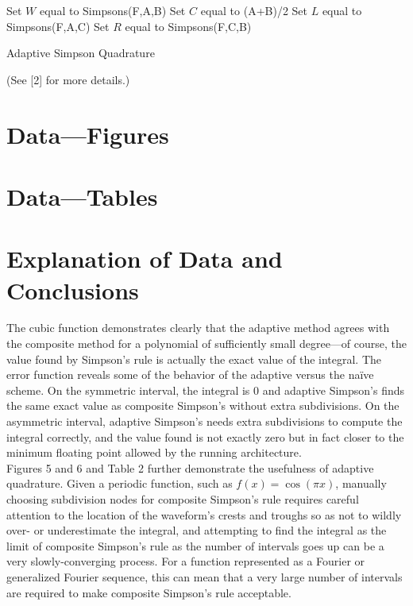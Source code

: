 \documentclass[11pt]{article} %
\begin{document}
\begin{algorithm}[H]
 Set $W$ equal to Simpsons(F,A,B)\;
Set $C$ equal to (A+B)/2\;
Set $L$ equal to Simpsons(F,A,C)\;
Set $R$ equal to Simpsons(F,C,B)\;

 \caption{Adaptive Simpson Quadrature}
\end{algorithm}

(See [2] for more details.)
\section{Data---Figures}


\section{Data---Tables}


\section{Explanation of Data and Conclusions}
The cubic function demonstrates clearly that the adaptive method agrees with the composite method for a polynomial of sufficiently small degree—of course, the value found by Simpson’s rule is actually the exact value of the integral. The error function reveals some of the behavior of the adaptive versus the naïve scheme. On the symmetric interval, the integral is 0 and adaptive Simpson’s finds the same exact value as composite Simpson’s without extra subdivisions. On the asymmetric interval, adaptive Simpson’s needs extra subdivisions to compute the integral correctly, and the value found is not exactly zero but in fact closer to the minimum floating point allowed by the running architecture.\\
Figures 5 and 6 and Table 2 further demonstrate the usefulness of adaptive quadrature. Given a periodic function, such as $f(x) = \cos(\pi x)$, manually choosing subdivision nodes for composite Simpson's rule requires careful attention to the location of the waveform's crests and troughs so as not to wildly over- or underestimate the integral, and attempting to find the integral as the limit of composite Simpson's rule as the number of intervals goes up can be a very slowly-converging process. For a function represented as a Fourier or generalized Fourier sequence, this can mean that a very large number of intervals are required to make composite Simpson's rule acceptable. 
\end{document}
